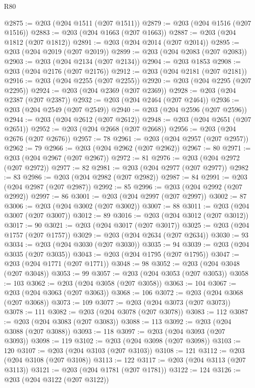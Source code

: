 \begin{lexlean}{R80}
\begin{coremodule}
@2875 := @203 (@204 @1511 (@207 @1511))
@2879 := @203 (@204 @1516 (@207 @1516))
@2883 := @203 (@204 @1663 (@207 @1663))
@2887 := @203 (@204 @1812 (@207 @1812))
@2891 := @203 (@204 @2014 (@207 @2014))
@2895 := @203 (@204 @2019 (@207 @2019))
@2899 := @203 (@204 @2083 (@207 @2083))
@2903 := @203 (@204 @2134 (@207 @2134))
@2904 := @203 @1853
@2908 := @203 (@204 @2176 (@207 @2176))
@2912 := @203 (@204 @2181 (@207 @2181))
@2916 := @203 (@204 @2255 (@207 @2255))
@2920 := @203 (@204 @2295 (@207 @2295))
@2924 := @203 (@204 @2369 (@207 @2369))
@2928 := @203 (@204 @2387 (@207 @2387))
@2932 := @203 (@204 @2464 (@207 @2464))
@2936 := @203 (@204 @2549 (@207 @2549))
@2940 := @203 (@204 @2596 (@207 @2596))
@2944 := @203 (@204 @2612 (@207 @2612))
@2948 := @203 (@204 @2651 (@207 @2651))
@2952 := @203 (@204 @2668 (@207 @2668))
@2956 := @203 (@204 @2676 (@207 @2676))
@2957 := 78
@2961 := @203 (@204 @2957 (@207 @2957))
@2962 := 79
@2966 := @203 (@204 @2962 (@207 @2962))
@2967 := 80
@2971 := @203 (@204 @2967 (@207 @2967))
@2972 := 81
@2976 := @203 (@204 @2972 (@207 @2972))
@2977 := 82
@2981 := @203 (@204 @2977 (@207 @2977))
@2982 := 83
@2986 := @203 (@204 @2982 (@207 @2982))
@2987 := 84
@2991 := @203 (@204 @2987 (@207 @2987))
@2992 := 85
@2996 := @203 (@204 @2992 (@207 @2992))
@2997 := 86
@3001 := @203 (@204 @2997 (@207 @2997))
@3002 := 87
@3006 := @203 (@204 @3002 (@207 @3002))
@3007 := 88
@3011 := @203 (@204 @3007 (@207 @3007))
@3012 := 89
@3016 := @203 (@204 @3012 (@207 @3012))
@3017 := 90
@3021 := @203 (@204 @3017 (@207 @3017))
@3025 := @203 (@204 @1757 (@207 @1757))
@3029 := @203 (@204 @2634 (@207 @2634))
@3030 := 93
@3034 := @203 (@204 @3030 (@207 @3030))
@3035 := 94
@3039 := @203 (@204 @3035 (@207 @3035))
@3043 := @203 (@204 @1795 (@207 @1795))
@3047 := @203 (@204 @1771 (@207 @1771))
@3048 := 98
@3052 := @203 (@204 @3048 (@207 @3048))
@3053 := 99
@3057 := @203 (@204 @3053 (@207 @3053))
@3058 := 103
@3062 := @203 (@204 @3058 (@207 @3058))
@3063 := 104
@3067 := @203 (@204 @3063 (@207 @3063))
@3068 := 106
@3072 := @203 (@204 @3068 (@207 @3068))
@3073 := 109
@3077 := @203 (@204 @3073 (@207 @3073))
@3078 := 111
@3082 := @203 (@204 @3078 (@207 @3078))
@3083 := 112
@3087 := @203 (@204 @3083 (@207 @3083))
@3088 := 113
@3092 := @203 (@204 @3088 (@207 @3088))
@3093 := 118
@3097 := @203 (@204 @3093 (@207 @3093))
@3098 := 119
@3102 := @203 (@204 @3098 (@207 @3098))
@3103 := 120
@3107 := @203 (@204 @3103 (@207 @3103))
@3108 := 121
@3112 := @203 (@204 @3108 (@207 @3108))
@3113 := 122
@3117 := @203 (@204 @3113 (@207 @3113))
@3121 := @203 (@204 @1781 (@207 @1781))
@3122 := 124
@3126 := @203 (@204 @3122 (@207 @3122))

\end{coremodule}
\end{lexlean}
